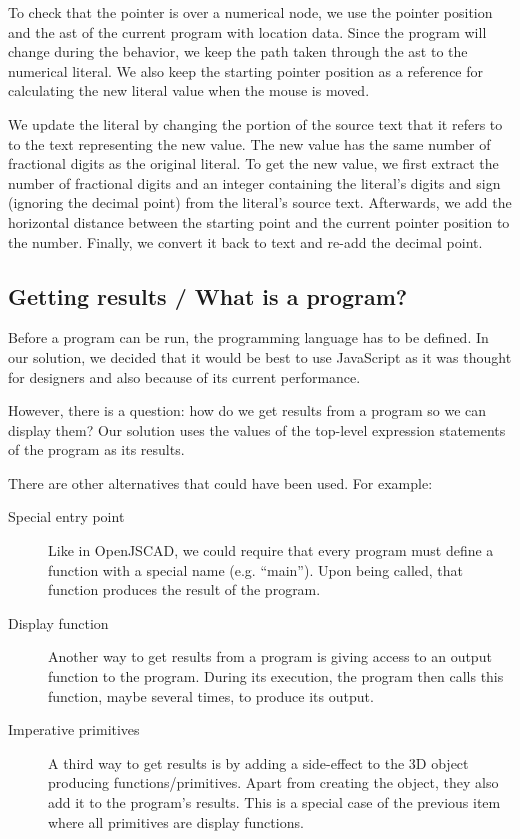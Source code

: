 To check that the pointer is over a numerical node, we use the pointer position and the \gls{ast} of the current program with location data.
Since the program will change during the behavior, we keep the path taken through the \gls{ast} to the numerical literal.
We also keep the starting pointer position as a reference for calculating the new literal value when the mouse is moved.

We update the literal by changing the portion of the source text that it refers to to the text representing the new value.
The new value has the same number of fractional digits as the original literal.
To get the new value, we first extract the number of fractional digits and an integer containing the literal's digits and sign (ignoring the decimal point) from the literal's source text.
Afterwards, we add the horizontal distance between the starting point and the current pointer position to the number.
Finally, we convert it back to text and re-add the decimal point.


\subsection{Getting results / What is a program?}
Before a program can be run, the programming language has to be defined.
In our solution, we decided that it would be best to use JavaScript as it was thought for designers and also because of its current performance.

However, there is a question: how do we get results from a program so we can display them?
Our solution uses the values of the top-level expression statements of the program as its results.

There are other alternatives that could have been used.
For example:
\begin{description}
  \item[Special entry point] Like in OpenJSCAD, we could require that every program must define a function with a special name (e.g. ``main''). Upon being called, that function produces the result of the program.
  \item[Display function] Another way to get results from a program is giving access to an output function to the program. During its execution, the program then calls this function, maybe several times, to produce its output.
  \item[Imperative primitives] A third way to get results is by adding a side-effect to the 3D object producing functions/primitives. Apart from creating the object, they also add it to the program's results. This is a special case of the previous item where all primitives are display functions.
\end{description}

